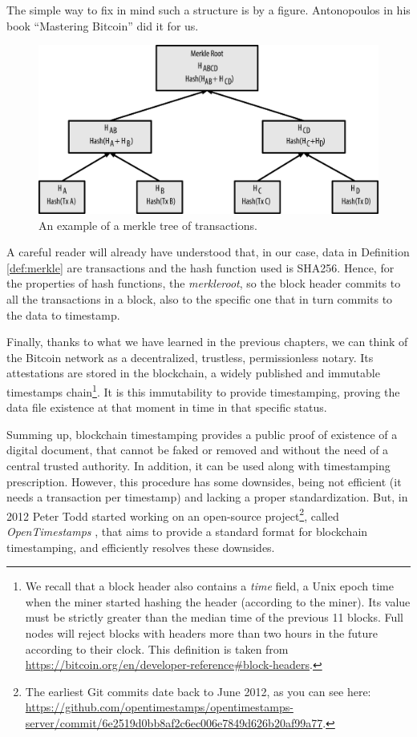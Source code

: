 \bigskip
\noindent
The simple way to fix in mind such a structure is by a figure. Antonopoulos in his book \enquote{Mastering Bitcoin} \cite{Antonopoulos:2017:MBP:3164842} did it for us.

\begin{figure}[ht]
    \centering
	\includegraphics[width=0.9\linewidth]{Images/merkle-tree.png}
	\caption{An example of a merkle tree of transactions.}
	\label{fig:merkle}
\end{figure}

\bigskip
\noindent
A careful reader will already have understood that, in our case, data in Definition \ref{def:merkle} are transactions and the hash function used  is SHA256. Hence, for the properties of hash functions, the \textit{merkleroot}, so the block header commits to all the transactions in a block, also to the specific one that in turn commits to the data to timestamp. 

\bigskip
\noindent
Finally, thanks to what we have learned in the previous chapters, we can think of the Bitcoin network as a decentralized, trustless, permissionless notary. Its attestations are stored in the blockchain, a widely published and immutable timestamps chain\footnote{We recall that a block header also contains a \textit{time} field, a Unix epoch time when the miner started hashing the header (according to the miner). Its value must be strictly greater than the median time of the previous 11 blocks. Full nodes will reject blocks with headers more than two hours in the future according to their clock. This definition is taken from \url{https://bitcoin.org/en/developer-reference\#block-headers}.}. It is this immutability to provide timestamping, proving the data file existence at that moment in time in that specific status.

\bigskip
\noindent
Summing up, blockchain timestamping provides a public proof of existence of a digital document, that cannot be faked or removed and without the need of a central trusted authority. In addition, it can be used along with timestamping prescription. However, this procedure has some downsides, being not efficient (it needs a transaction per timestamp) and lacking a proper standardization. But, in 2012 Peter Todd started working on an open-source project\footnote{The earliest Git commits date back to June 2012, as you can see here: \url{https://github.com/opentimestamps/opentimestamps-server/commit/6e2519d0bb8af2c6ec006e7849d626b20af99a77}.}, called \textit{OpenTimestamps} \cite{OTSWeb}, that aims to provide a standard format for blockchain timestamping, and efficiently resolves these downsides.

